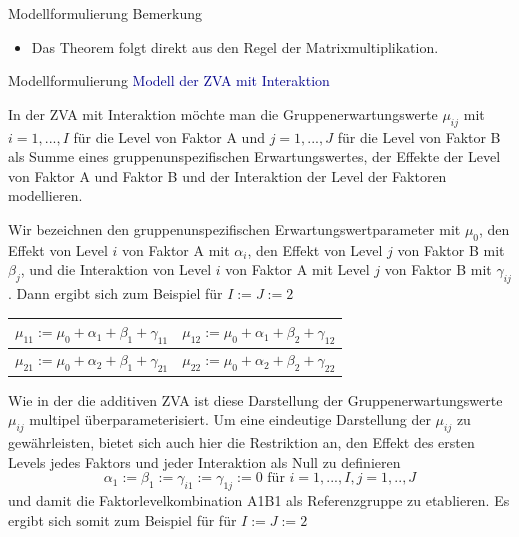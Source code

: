 \documentclass[
  8pt,
  ignorenonframetext,
]{beamer}
\providecommand{\tightlist}{%
  \setlength{\itemsep}{0pt}\setlength{\parskip}{0pt}}
\begin{document}
\begin{frame}{Modellformulierung}
Bemerkung \vspace{-1mm}

\begin{itemize}
\tightlist
\item
  Das Theorem folgt direkt aus den Regel der Matrixmultiplikation.
\end{itemize}
\end{frame}

\begin{frame}{Modellformulierung}
\protect\hypertarget{modellformulierung-5}{}
\textcolor{darkblue}{Modell der ZVA mit Interaktion} \footnotesize
{}

In der ZVA mit Interaktion möchte man die Gruppenerwartungswerte
\(\mu_{ij}\) mit \(i = 1,...,I\) für die Level von Faktor A und
\(j = 1,...,J\) für die Level von Faktor B als Summe eines
gruppenunspezifischen Erwartungswertes, der Effekte der Level von Faktor
A und Faktor B und der Interaktion der Level der Faktoren modellieren.

Wir bezeichnen den gruppenunspezifischen Erwartungswertparameter mit
\(\mu_0\), den Effekt von Level \(i\) von Faktor A mit \(\alpha_i\), den
Effekt von Level \(j\) von Faktor B mit \(\beta_j\), und die Interaktion
von Level \(i\) von Faktor A mit Level \(j\) von Faktor B mit
\(\gamma_{ij}\). Dann ergibt sich zum Beispiel für \(I := J := 2\)

\begin{center}
\begin{tabular}{l|l}
$\mu_{11} := \mu_0 + \alpha_1 + \beta_1 + \gamma_{11}$ & $\mu_{12} := \mu_0 + \alpha_1 + \beta_2 + \gamma_{12}$ \\\hline
$\mu_{21} := \mu_0 + \alpha_2 + \beta_1 + \gamma_{21}$ & $\mu_{22} := \mu_0 + \alpha_2 + \beta_2 + \gamma_{22}$ \\
\end{tabular}
\end{center}

Wie in der die additiven ZVA ist diese Darstellung der
Gruppenerwartungswerte \(\mu_{ij}\) multipel überparameterisiert. Um
eine eindeutige Darstellung der \(\mu_{ij}\) zu gewährleisten, bietet
sich auch hier die Restriktion an, den Effekt des ersten Levels jedes
Faktors und jeder Interaktion als Null zu definieren \begin{equation}
\alpha_1 := \beta_1 := \gamma_{i1} := \gamma_{1j} := 0 \mbox{ für } i = 1,...,I, j = 1,..,J
\end{equation} und damit die Faktorlevelkombination A1B1 als
Referenzgruppe zu etablieren. Es ergibt sich somit zum Beispiel für für
\(I := J := 2\)


\end{frame}
\end{document}
